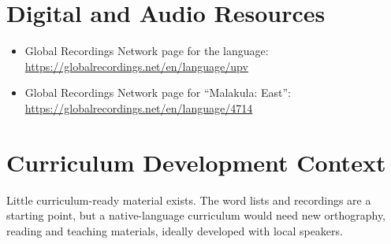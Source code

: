 \documentclass[12pt]{article}
\begin{document}
\section{Digital and Audio Resources}
\begin{itemize}
\item Global Recordings Network page for the language: \url{https://globalrecordings.net/en/language/upv}
\item Global Recordings Network page for ``Malakula: East'': \url{https://globalrecordings.net/en/language/4714}
\end{itemize}

\section{Curriculum Development Context}
Little curriculum-ready material exists. The word lists and recordings are a starting point, but a native-language curriculum would need new orthography, reading and teaching materials, ideally developed with local speakers.
\end{document}
